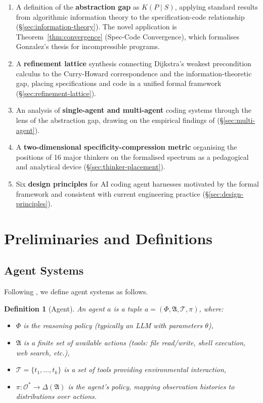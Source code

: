 \documentclass[11pt, a4paper, copyright]{googledeepmind}
\newtheorem{definition}{Definition}[section]
\begin{document}
\begin{enumerate}
    \item A definition of the \textbf{abstraction gap} as $K(P \mid S)$, applying standard results from algorithmic information theory to the specification-code relationship (\S\ref{sec:information-theory}). The novel application is Theorem~\ref{thm:convergence} (Spec-Code Convergence), which formalises Gonzalez's thesis for incompressible programs.
    \item A \textbf{refinement lattice} synthesis connecting Dijkstra's weakest precondition calculus to the Curry-Howard correspondence and the information-theoretic gap, placing specifications and code in a unified formal framework (\S\ref{sec:refinement-lattice}).
    \item An analysis of \textbf{single-agent and multi-agent} coding systems through the lens of the abstraction gap, drawing on the empirical findings of \citet{kim2025scaling} (\S\ref{sec:multi-agent}).
    \item A \textbf{two-dimensional specificity-compression metric} organising the positions of 16 major thinkers on the formalised spectrum as a pedagogical and analytical device (\S\ref{sec:thinker-placement}).
    \item Six \textbf{design principles} for AI coding agent harnesses motivated by the formal framework and consistent with current engineering practice (\S\ref{sec:design-principles}).
\end{enumerate}


\section{Preliminaries and Definitions}
\label{sec:preliminaries}

\subsection{Agent Systems}

Following \citet{kim2025scaling}, we define agent systems as follows.

\begin{definition}[Agent]
An \emph{agent} $a$ is a tuple $a = (\Phi, \mathfrak{A}, \mathcal{T}, \pi)$, where:
\begin{itemize}
    \item $\Phi$ is the \emph{reasoning policy} (typically an LLM with parameters $\theta$),
    \item $\mathfrak{A}$ is a finite set of \emph{available actions} (tools: file read/write, shell execution, web search, etc.),
    \item $\mathcal{T} = \{t_1, \ldots, t_k\}$ is a set of \emph{tools} providing environmental interaction,
    \item $\pi: \mathcal{O}^* \to \Delta(\mathfrak{A})$ is the agent's \emph{policy}, mapping observation histories to distributions over actions.
\end{itemize}
\end{definition}
\end{document}
